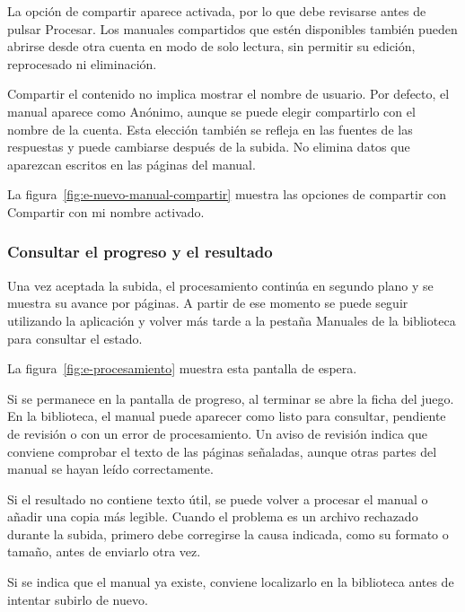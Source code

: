 La opción de compartir aparece activada, por lo que debe revisarse antes
de pulsar \guillemotleft{}Procesar\guillemotright{}. Los manuales compartidos
que estén disponibles también pueden abrirse desde otra cuenta en modo
de solo lectura, sin permitir su edición, reprocesado ni eliminación.

Compartir el contenido no implica mostrar el nombre de usuario. Por
defecto, el manual aparece como \guillemotleft{}Anónimo\guillemotright{},
aunque se puede elegir compartirlo con el nombre de la cuenta. Esta
elección también se refleja en las fuentes de las respuestas y puede
cambiarse después de la subida. No elimina datos que aparezcan escritos
en las páginas del manual.

La figura~\ref{fig:e-nuevo-manual-compartir} muestra las opciones de
compartir con \guillemotleft{}Compartir con mi nombre\guillemotright{} activado.


\subsubsection{Consultar el progreso y el resultado}

Una vez aceptada la subida, el procesamiento continúa en segundo plano y
se muestra su avance por páginas. A partir de ese momento se puede seguir
utilizando la aplicación y volver más tarde a la pestaña
\guillemotleft{}Manuales\guillemotright{} de la biblioteca para consultar
el estado.

La figura~\ref{fig:e-procesamiento} muestra esta pantalla de espera.


Si se permanece en la pantalla de progreso, al terminar se abre la ficha
del juego. En la biblioteca, el manual puede aparecer como listo para
consultar, pendiente de revisión o con un error de procesamiento. Un aviso
de revisión indica que conviene comprobar el texto de las páginas
señaladas, aunque otras partes del manual se hayan leído correctamente.

Si el resultado no contiene texto útil, se puede volver a procesar el
manual o añadir una copia más legible. Cuando el problema es un archivo
rechazado durante la subida, primero debe corregirse la causa indicada,
como su formato o tamaño, antes de enviarlo otra vez.

Si se indica que el manual ya existe, conviene localizarlo en la biblioteca
antes de intentar subirlo de nuevo.

